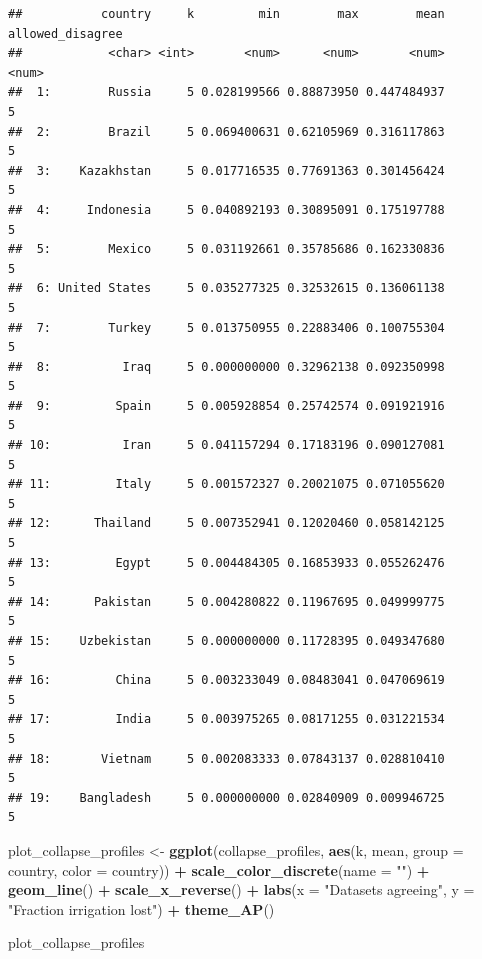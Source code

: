 \documentclass[
  11pt,
]{article}
\newenvironment{Shaded}{\begin{snugshade}}{\end{snugshade}}
\newcommand{\AttributeTok}[1]{\textcolor[rgb]{0.13,0.29,0.53}{#1}}
\newcommand{\FunctionTok}[1]{\textcolor[rgb]{0.13,0.29,0.53}{\textbf{#1}}}
\newcommand{\NormalTok}[1]{#1}
\newcommand{\OtherTok}[1]{\textcolor[rgb]{0.56,0.35,0.01}{#1}}
\newcommand{\SpecialCharTok}[1]{\textcolor[rgb]{0.81,0.36,0.00}{\textbf{#1}}}
\newcommand{\StringTok}[1]{\textcolor[rgb]{0.31,0.60,0.02}{#1}}
\begin{document}
\begin{verbatim}
##           country     k         min        max        mean allowed_disagree
##            <char> <int>       <num>      <num>       <num>            <num>
##  1:        Russia     5 0.028199566 0.88873950 0.447484937                5
##  2:        Brazil     5 0.069400631 0.62105969 0.316117863                5
##  3:    Kazakhstan     5 0.017716535 0.77691363 0.301456424                5
##  4:     Indonesia     5 0.040892193 0.30895091 0.175197788                5
##  5:        Mexico     5 0.031192661 0.35785686 0.162330836                5
##  6: United States     5 0.035277325 0.32532615 0.136061138                5
##  7:        Turkey     5 0.013750955 0.22883406 0.100755304                5
##  8:          Iraq     5 0.000000000 0.32962138 0.092350998                5
##  9:         Spain     5 0.005928854 0.25742574 0.091921916                5
## 10:          Iran     5 0.041157294 0.17183196 0.090127081                5
## 11:         Italy     5 0.001572327 0.20021075 0.071055620                5
## 12:      Thailand     5 0.007352941 0.12020460 0.058142125                5
## 13:         Egypt     5 0.004484305 0.16853933 0.055262476                5
## 14:      Pakistan     5 0.004280822 0.11967695 0.049999775                5
## 15:    Uzbekistan     5 0.000000000 0.11728395 0.049347680                5
## 16:         China     5 0.003233049 0.08483041 0.047069619                5
## 17:         India     5 0.003975265 0.08171255 0.031221534                5
## 18:       Vietnam     5 0.002083333 0.07843137 0.028810410                5
## 19:    Bangladesh     5 0.000000000 0.02840909 0.009946725                5
\end{verbatim}

\begin{Shaded}
\begin{Highlighting}[]
\NormalTok{plot\_collapse\_profiles }\OtherTok{\textless{}{-}} \FunctionTok{ggplot}\NormalTok{(collapse\_profiles, }\FunctionTok{aes}\NormalTok{(k, mean, }\AttributeTok{group =}\NormalTok{ country,}
                              \AttributeTok{color =}\NormalTok{ country)) }\SpecialCharTok{+}
  \FunctionTok{scale\_color\_discrete}\NormalTok{(}\AttributeTok{name =} \StringTok{""}\NormalTok{) }\SpecialCharTok{+}
  \FunctionTok{geom\_line}\NormalTok{() }\SpecialCharTok{+}
  \FunctionTok{scale\_x\_reverse}\NormalTok{() }\SpecialCharTok{+}
  \FunctionTok{labs}\NormalTok{(}\AttributeTok{x =} \StringTok{"Datasets agreeing"}\NormalTok{, }\AttributeTok{y =} \StringTok{"Fraction irrigation lost"}\NormalTok{) }\SpecialCharTok{+}
  \FunctionTok{theme\_AP}\NormalTok{()}

\NormalTok{plot\_collapse\_profiles}
\end{Highlighting}
\end{Shaded}
\end{document}
